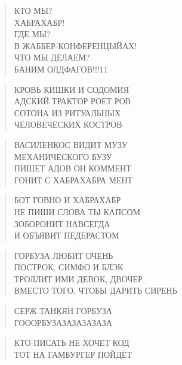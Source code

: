 \poemtitle{***}
\begin{verse}
КТО МЫ? \\
ХАБРАХАБР!\\
ГДЕ МЫ?\\
В ЖАББЕР-КОНФЕРЕНЦЫЙАХ!\\
ЧТО МЫ ДЕЛАЕМ? \\
БАНИМ ОЛДФАГОВ!!!11
\end{verse}

\poemtitle{***}
\begin{verse}
КРОВЬ КИШКИ И СОДОМИЯ\\
АДСКИЙ ТРАКТОР РОЕТ РОВ\\
СОТОНА ИЗ РИТУАЛЬНЫХ\\
ЧЕЛОВЕЧЕСКИХ КОСТРОВ
\end{verse}

\poemtitle{***}
\begin{verse}
ВАСИЛЕНКОС ВИДИТ МУЗУ\\
МЕХАНИЧЕСКОГО БУЗУ\\
ПИШЕТ АДОВ ОН КОММЕНТ\\
ГОНИТ С ХАБРАХАБРА МЕНТ
\end{verse}

\poemtitle{***}
\begin{verse}
БОТ ГОВНО И ХАБРАХАБР\\
НЕ ПИШИ СЛОВА ТЫ КАПСОМ\\
ЗОБОРОНИТ НАВСЕГДА\\
И ОБЪЯВИТ ПЕДЕРАСТОМ
\end{verse}

\poemtitle{***}
\begin{verse}
ГОРБУЗА ЛЮБИТ ОЧЕНЬ\\
ПОСТРОК, СИМФО И БЛЭК\\
ТРОЛЛИТ ИМИ ДЕВОК, ДВОЧЕР\\
ВМЕСТО ТОГО, ЧТОБЫ ДАРИТЬ СИРЕНЬ
\end{verse}

\poemtitle{***}
\begin{verse}
СЕРЖ ТАНКЯН ГОРБУЗА\\
ГОООРБУЗАЗАЗАЗАЗАЗА
\end{verse}

\poemtitle{***}
\begin{verse}
КТО ПИСАТЬ НЕ ХОЧЕТ КОД\\
ТОТ НА ГАМБУРГЕР ПОЙДЁТ
\end{verse}

